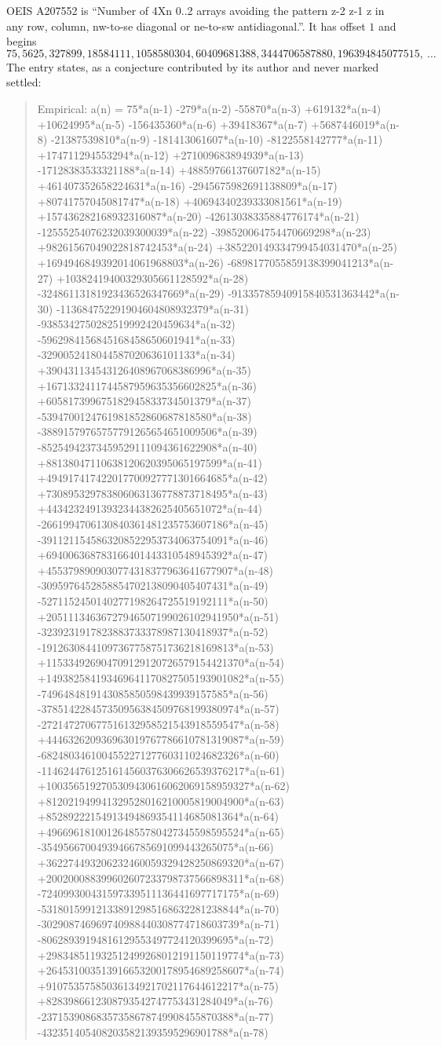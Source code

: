 \documentclass[11pt,a4paper]{article}
\theoremstyle{plain}
\theoremstyle{definition}
\begin{document}
OEIS A207552 is ``Number of 4Xn 0..2 arrays avoiding the pattern z-2 z-1 z in any row, column, nw-to-se diagonal or ne-to-sw antidiagonal.''. It has offset $1$ and begins
\[
75, 5625, 327899, 18584111, 1058580304, 60409681388, 3444706587880, 196394845077515,\ \dots
\]
The entry states, as a conjecture contributed by its author and never marked settled:
\begin{quote}
Empirical: a(n) = 75*a(n-1) -279*a(n-2) -55870*a(n-3) +619132*a(n-4) +10624995*a(n-5) -156435360*a(n-6) +39418367*a(n-7) +5687446019*a(n-8) -21387539810*a(n-9) -181413061607*a(n-10) -8122558142777*a(n-11) +174711294553294*a(n-12) +271009683894939*a(n-13) -17128383533321188*a(n-14) +48859766137607182*a(n-15) +461407352658224631*a(n-16) -2945675982691138809*a(n-17) +80741757045081747*a(n-18) +40694340239333081561*a(n-19) +157436282168932316087*a(n-20) -42613038335884776174*a(n-21) -12555254076232039300039*a(n-22) -398520064754470669298*a(n-23) +98261567049022818742453*a(n-24) +385220149334799454031470*a(n-25) +1694946849392014061968803*a(n-26) -6898177055859138399041213*a(n-27) +10382419400329305661128592*a(n-28) -32486113181923436526347669*a(n-29) -91335785940915840531363442*a(n-30) -113684752291904604808932379*a(n-31) -9385342750282519992420459634*a(n-32) -5962984156845168458650601941*a(n-33) -3290052418044587020636101133*a(n-34) +390431134543126408967068386996*a(n-35) +1671332411744587959635356602825*a(n-36) +605817399675182945833734501379*a(n-37) -5394700124761981852860687818580*a(n-38) -38891579765757791265654651009506*a(n-39) -85254942373459529111094361622908*a(n-40) +88138047110638120620395065197599*a(n-41) +494917417422017700927771301664685*a(n-42) +730895329783806063136778873718495*a(n-43) +44342324913932344382625405651072*a(n-44) -2661994706130840361481235753607186*a(n-45) -3911211545863208522953734063754091*a(n-46) +694006368783166401443310548945392*a(n-47) +4553798909030774318377963641677907*a(n-48) -3095976452858854702138090405407431*a(n-49) -5271152450140277198264725519192111*a(n-50) +20511134636727946507199026102941950*a(n-51) -3239231917823883733378987130418937*a(n-52) -19126308441097367758751736218169813*a(n-53) +115334926904709129120726579154421370*a(n-54) +149382584193469641170827505193901082*a(n-55) -7496484819143085850598439939157585*a(n-56) -378514228457350956384509768199380974*a(n-57) -272147270677516132958521543918559547*a(n-58) +444632620936963019767786610781319087*a(n-59) -682480346100455227127760311024682326*a(n-60) -1146244761251614560376306626539376217*a(n-61) +1003565192705309430616062069158959327*a(n-62) +812021949941329528016210005819004900*a(n-63) +85289222154913494869354114685081364*a(n-64) +496696181001264855780427345598595524*a(n-65) -35495667004939466785691099443265075*a(n-66) +362274493206232460059329428250869320*a(n-67) +200200088399602607233798737566898311*a(n-68) -724099300431597339511136441697717175*a(n-69) -531801599121338912985168632281238844*a(n-70) -302908746969740988440308774718603739*a(n-71) -80628939194816129553497724120399695*a(n-72) +298348511932512499268012191150119774*a(n-73) +264531003513916653200178954689258607*a(n-74) +91075357585036134921702117644612217*a(n-75) +8283986612308793542747753431284049*a(n-76) -23715390868357358678749908455870388*a(n-77) -4323514054082035821393595296901788*a(n-78) 
\end{quote}
\end{document}
